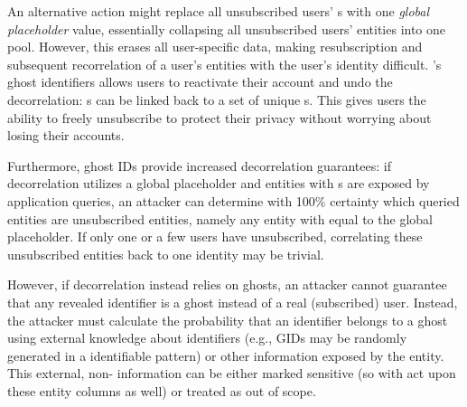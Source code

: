 An alternative action might replace all unsubscribed users' \uidkey{}s with one \emph{global
placeholder} value, essentially collapsing all unsubscribed users' entities into one pool. However,
this erases all user-specific data, making resubscription and subsequent recorrelation of a user's
entities with the user's identity difficult. \sys{}'s ghost identifiers allows users to reactivate
their account and undo the decorrelation: \uidkey{}s can be linked back to a set of unique
\gidkey{}s.  This gives users the ability to freely unsubscribe to protect their privacy without
worrying about losing their accounts.  

Furthermore, ghost IDs provide increased decorrelation guarantees: if decorrelation utilizes a
global placeholder and entities with \uidkey{}s are exposed by application queries, an attacker can
determine with 100\% certainty which queried entities are unsubscribed entities, namely any entity
with \uidkey{} equal to the global placeholder. If only one or a few users have unsubscribed,
correlating these unsubscribed entities back to one identity may be trivial.

However, if decorrelation instead relies on ghosts, an attacker cannot guarantee that any revealed
identifier is a ghost instead of a real (subscribed) user. Instead, the attacker must calculate the
probability that an identifier belongs to a ghost using external knowledge about identifiers (e.g.,
GIDs may be randomly generated in a identifiable pattern) or other information exposed by the
entity. This external, non-\uidkey{} information can be either marked sensitive (so \sys{} with
act upon these entity columns as well) or treated as out of scope.
\fi
